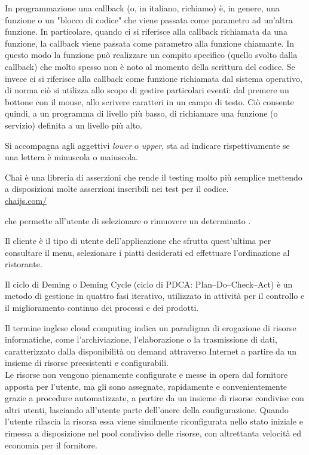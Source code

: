 In programmazione una callback (o, in italiano, richiamo) è, in genere, una funzione o un "blocco di codice" che viene passata come parametro ad un'altra funzione. 
In particolare, quando ci si riferisce alla callback richiamata da una funzione, la callback viene passata come parametro alla funzione chiamante. In questo modo la funzione può realizzare un compito specifico (quello svolto dalla callback) che molto spesso non è noto al momento della scrittura del codice. Se invece ci si riferisce alla callback come funzione richiamata dal sistema operativo, di norma ciò si utilizza allo scopo di gestire particolari eventi: dal premere un bottone con il mouse, allo scrivere caratteri in un campo di testo. Ciò consente quindi, a un programma di livello più basso, di richiamare una funzione (o servizio) definita a un livello più alto.

Si accompagna agli aggettivi \textit{lower} o \textit{upper}, sta ad indicare rispettivamente se una lettera è minuscola o maiuscola.


Chai è una libreria  di asserzioni che rende il testing molto più semplice mettendo a disposizioni molte asserzioni inseribili nei test per il codice.\\
\url{chaijs.com/}

 che permette all’utente di selezionare o rimuovere un determinato .

Il cliente è il tipo di utente dell’applicazione che sfrutta quest’ultima per consultare il menu, selezionare i piatti desiderati ed effettuare l’ordinazione al ristorante.

Il ciclo di Deming o Deming Cycle (ciclo di PDCA: Plan–Do–Check–Act) è un metodo di gestione in quattro fasi iterativo, utilizzato in attività per il controllo e il miglioramento continuo dei processi e dei prodotti.

Il termine inglese cloud computing indica un paradigma di erogazione di risorse informatiche, come l'archiviazione, l'elaborazione o la trasmissione di dati, caratterizzato dalla disponibilità on demand attraverso Internet a partire da un insieme di risorse preesistenti e configurabili.\\
Le risorse non vengono pienamente configurate e messe in opera dal fornitore apposta per l'utente, ma gli sono assegnate, rapidamente e convenientemente grazie a procedure automatizzate, a partire da un insieme di risorse condivise con altri utenti, lasciando all'utente parte dell'onere della configurazione. Quando l'utente rilascia la risorsa essa viene similmente riconfigurata nello stato iniziale e rimessa a disposizione nel pool condiviso delle risorse, con altrettanta velocità ed economia per il fornitore.

